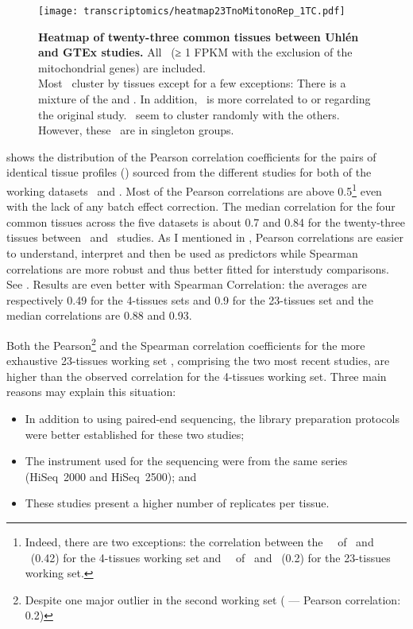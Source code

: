\begin{figure}[!htpb]
    \texttt{[image: transcriptomics/heatmap23TnoMitonoRep\_1TC.pdf]}\centering
    \caption[Heatmap of 23 common tissues between Uhlén and GTEx studies]%
    {\label{fig:noMitoNoRep23T}%
    \textbf{Heatmap of twenty-three common tissues between Uhlén and GTEx studies.}
    All \pcgs\ (≥ 1 FPKM with the exclusion of the mitochondrial
    genes) are included.\\Most \treps\ cluster by tissues except for a few exceptions:
    There is a mixture of the 
    and  \treps.
    In addition,  \treps\ is more correlated to
     or  regarding the original study.
     \treps\ seem to cluster randomly with the others.
    However, these \treps\ are in singleton groups.}
\end{figure}

 shows the distribution of the Pearson correlation
coefficients for the pairs of identical tissue profiles (\treps)
sourced from the different studies
for both of the working datasets \setOne\ and \setTwo.
Most of the Pearson correlations are above 0.5\footnote{Indeed,
there are two exceptions: the
correlation between the \Testis\ \treps\ of \castle\ and \vt\ (0.42)
for the 4-tissues working set and
\Salivary\ \treps\ of \uhlen\ and \gtex\ (0.2)
for the 23-tissues working set.}
even with the lack of any batch effect correction.
The median correlation for the four common tissues across the five datasets is
about 0.7 and 0.84 for the twenty-three tissues between \uhlen\ and \gtex\ studies.
As I mentioned in ,
Pearson correlations are easier to understand, interpret
and then be used as predictors
while Spearman correlations are more robust and thus better fitted for interstudy
comparisons.
See .
Results are even better with Spearman Correlation:
the averages are respectively 0.49 for the 4-tissues sets
and 0.9 for the 23-tissues set and
the median correlations are 0.88 and 0.93.

\label{seg:betterTreps}
Both the Pearson\footnote{Despite one major outlier in the second
working set ( --- Pearson correlation: 0.2)} and the
Spearman correlation coefficients for the more exhaustive 23-tissues working set
\setTwo,
comprising the two most recent studies,
are higher than the observed correlation for the 4-tissues working set.
Three main reasons may explain this situation:
\begin{itemize}[topsep=0pt,nosep]
    \item In addition to using paired-end sequencing,
        the library preparation protocols were better established
        for these two studies;
    \item The instrument used for the sequencing were
        from the same series (HiSeq~2000 and HiSeq~2500); and
    \item These studies present a higher number of replicates per tissue.
\end{itemize}

